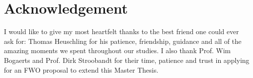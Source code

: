 \chapter*{Acknowledgement}

I would like to give my most heartfelt thanks to the best friend one could ever ask for: Thomas Heuschling for his patience, friendship, guidance and all of the amazing moments we spent throughout our studies. I also thank Prof. Wim Bogaerts and Prof. Dirk Stroobandt for their time, patience and trust in applying for an FWO proposal to extend this Master Thesis.